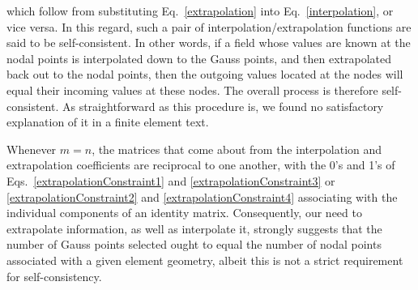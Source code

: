 which follow from substituting Eq.~\ref{extrapolation} into Eq.~\ref{interpolation}, or vice versa.  In this regard, such a pair of interpolation\slash extrapolation functions are said to be self-consistent. In other words, if a field whose values are known at the nodal points is interpolated down to the Gauss points, and then extrapolated back out to the nodal points, then the outgoing values located at the nodes will equal their incoming values at these nodes. The overall process is therefore self-consistent.  As straight\-forward as this procedure is, we found no satisfactory explanation of it in a finite element text.

Whenever $m=n$, the matrices that come about from the interpolation and extrapolation coefficients are reciprocal to one another, with the 0's and 1's of Eqs.~\ref{extrapolationConstraint1} and \ref{extrapolationConstraint3} or \ref{extrapolationConstraint2} and \ref{extrapolationConstraint4} associating with the individual components of an identity matrix.  Consequently, our need to extrapolate information, as well as interpolate it, strongly suggests that the number of Gauss points selected ought to equal the number of nodal points associated with a given element geometry, albeit this is not a strict requirement for self-consistency.

